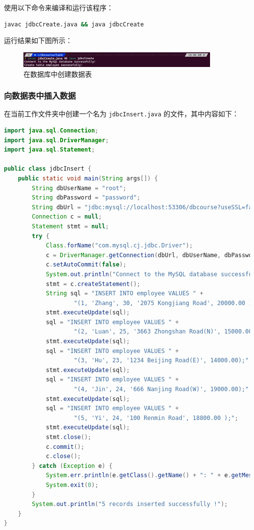 \documentclass{article}
\renewcommand\tt{\texttt}
\begin{document}
使用以下命令来编译和运行该程序：

\begin{lstlisting}[language=bash]
javac jdbcCreate.java && java jdbcCreate
\end{lstlisting}

运行结果如下图所示：

\begin{figure}[H]
  \centering
  \includegraphics[width=0.9\textwidth]{img/6.png}
  \caption{在数据库中创建数据表}
\end{figure}

\subsubsection{向数据表中插入数据}

在当前工作文件夹中创建一个名为 \tt{jdbcInsert.java} 的文件，其中内容如下：

\begin{lstlisting}[language=java]
import java.sql.Connection;
import java.sql.DriverManager;
import java.sql.Statement;

public class jdbcInsert {
    public static void main(String args[]) {
        String dbUserName = "root";
        String dbPassword = "password";
        String dbUrl = "jdbc:mysql://localhost:53306/dbcourse?useSSL=false&allowPublicKeyRetrieval=true";
        Connection c = null;
        Statement stmt = null;
        try {
            Class.forName("com.mysql.cj.jdbc.Driver");
            c = DriverManager.getConnection(dbUrl, dbUserName, dbPassword);
            c.setAutoCommit(false);
            System.out.println("Connect to the MySQL database successfully!");
            stmt = c.createStatement();
            String sql = "INSERT INTO employee VALUES " +
                    "(1, 'Zhang', 30, '2075 Kongjiang Road', 20000.00 );";
            stmt.executeUpdate(sql);
            sql = "INSERT INTO employee VALUES " +
                    "(2, 'Luan', 25, '3663 Zhongshan Road(N)', 15000.00 );";
            stmt.executeUpdate(sql);
            sql = "INSERT INTO employee VALUES " +
                    "(3, 'Hu', 23, '1234 Beijing Road(E)', 14000.00);";
            stmt.executeUpdate(sql);
            sql = "INSERT INTO employee VALUES " +
                    "(4, 'Jin', 24, '666 Nanjing Road(W)', 19000.00);";
            stmt.executeUpdate(sql);
            sql = "INSERT INTO employee VALUES " +
                    "(5, 'Yi', 24, '100 Renmin Road', 18800.00 );";
            stmt.executeUpdate(sql);
            stmt.close();
            c.commit();
            c.close();
        } catch (Exception e) {
            System.err.println(e.getClass().getName() + ": " + e.getMessage());
            System.exit(0);
        }
        System.out.println("5 records inserted successfully !");
    }
}
\end{lstlisting}
\end{document}
